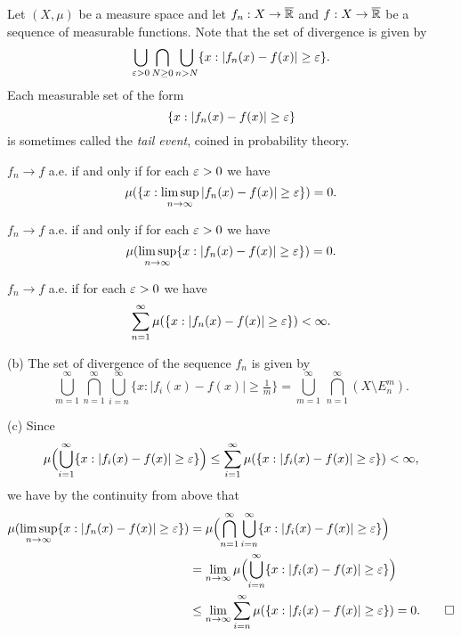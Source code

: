 \documentclass{../../large}
\begin{document}
\begin{prb}
Let $(X,\mu)$ be a measure space and let $f_n:X\to\overline{\mathbb{R}}$ and $f:X\to\overline{\mathbb{R}}$ be a sequence of measurable functions.
Note that the set of divergence is given by
\[\bigcup_{\varepsilon>0}\bigcap_{N\ge0}\bigcup_{n>N}\{x:|f_n(x)-f(x)|\ge\varepsilon\}.\]
Each measurable set of the form
\[\{x:|f_n(x)-f(x)|\ge\varepsilon\}\]
is sometimes called the \emph{tail event}, coined in probability theory.
\begin{parts}
\item $f_n\to f$ a.e. if and only if for each $\varepsilon>0$ we have
\[\mu(\{x:\limsup_{n\to\infty}|f_n(x)-f(x)|\ge\varepsilon\})=0.\]
\item $f_n\to f$ a.e. if and only if for each $\varepsilon>0$ we have
\[\mu(\limsup_{n\to\infty}\{x:|f_n(x)-f(x)|\ge\varepsilon\})=0.\]
\item $f_n\to f$ a.e. if for each $\varepsilon>0$ we have
\[\sum_{n=1}^\infty\mu(\{x:|f_n(x)-f(x)|\ge\varepsilon\})<\infty.\]
\end{parts}
\end{prb}
\begin{pf}
(b)
The set of divergence of the sequence $f_n$ is given by
\[\bigcup_{m=1}^\infty\bigcap_{n=1}^\infty\bigcup_{i=n}^\infty\{x:|f_i(x)-f(x)|\ge\tfrac1m\}=\bigcup_{m=1}^\infty\,\bigcap_{n=1}^\infty(X\setminus E_n^m).\]

(c)
Since
\[\mu\Bigl(\bigcup_{i=1}^\infty\{x:|f_i(x)-f(x)|\ge\varepsilon\}\Bigr)\le\sum_{i=1}^\infty\mu(\{x:|f_i(x)-f(x)|\ge\varepsilon\})<\infty,\]
we have by the continuity from above that
\begin{align*}
\mu(\limsup_{n\to\infty}\{x:|f_n(x)-f(x)|\ge\varepsilon\})
&=\mu\Bigl(\bigcap_{n=1}^\infty\bigcup_{i=n}^\infty\{x:|f_i(x)-f(x)|\ge\varepsilon\}\Bigr)\\
&=\lim_{n\to\infty}\mu\Bigl(\bigcup_{i=n}^\infty\{x:|f_i(x)-f(x)|\ge\varepsilon\}\Bigr)\\
&\le\lim_{n\to\infty}\sum_{i=n}^\infty\mu(\{x:|f_i(x)-f(x)|\ge\varepsilon\})
=0.\qedhere
\end{align*}
\end{pf}
\end{document}
